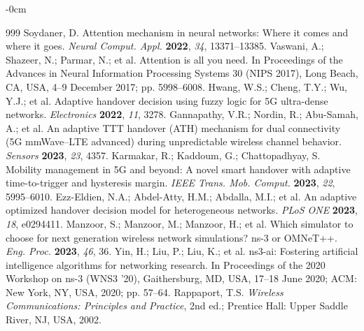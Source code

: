 \documentclass[remotesensing,article,submit,moreauthors]{Definitions/mdpi}
\begin{document}
\begin{adjustwidth}{-\extralength}{0cm}
\begin{thebibliography}{999}
Soydaner, D. Attention mechanism in neural networks: Where it comes and where it goes. {\em Neural Comput. Appl.} {\bf 2022}, {\em 34}, 13371--13385.
Vaswani, A.; Shazeer, N.; Parmar, N.; et al. Attention is all you need. In Proceedings of the Advances in Neural Information Processing Systems 30 (NIPS 2017), Long Beach, CA, USA, 4--9 December 2017; pp. 5998--6008.
Hwang, W.S.; Cheng, T.Y.; Wu, Y.J.; et al. Adaptive handover decision using fuzzy logic for 5G ultra-dense networks. {\em Electronics} {\bf 2022}, {\em 11}, 3278.
Gannapathy, V.R.; Nordin, R.; Abu-Samah, A.; et al. An adaptive TTT handover (ATH) mechanism for dual connectivity (5G mmWave--LTE advanced) during unpredictable wireless channel behavior. {\em Sensors} {\bf 2023}, {\em 23}, 4357.
Karmakar, R.; Kaddoum, G.; Chattopadhyay, S. Mobility management in 5G and beyond: A novel smart handover with adaptive time-to-trigger and hysteresis margin. {\em IEEE Trans. Mob. Comput.} {\bf 2023}, {\em 22}, 5995--6010.
Ezz-Eldien, N.A.; Abdel-Atty, H.M.; Abdalla, M.I.; et al. An adaptive optimized handover decision model for heterogeneous networks. {\em PLoS ONE} {\bf 2023}, {\em 18}, e0294411.
Manzoor, S.; Manzoor, M.; Manzoor, H.; et al. Which simulator to choose for next generation wireless network simulations? ns-3 or OMNeT++. {\em Eng. Proc.} {\bf 2023}, {\em 46}, 36.
Yin, H.; Liu, P.; Liu, K.; et al. ns3-ai: Fostering artificial intelligence algorithms for networking research. In Proceedings of the 2020 Workshop on ns-3 (WNS3 '20), Gaithersburg, MD, USA, 17--18 June 2020; ACM: New York, NY, USA, 2020; pp. 57--64.
Rappaport, T.S. \textit{Wireless Communications: Principles and Practice}, 2nd ed.; Prentice Hall: Upper Saddle River, NJ, USA, 2002.
\end{thebibliography}

\PublishersNote{}
\end{adjustwidth}
\end{document}
